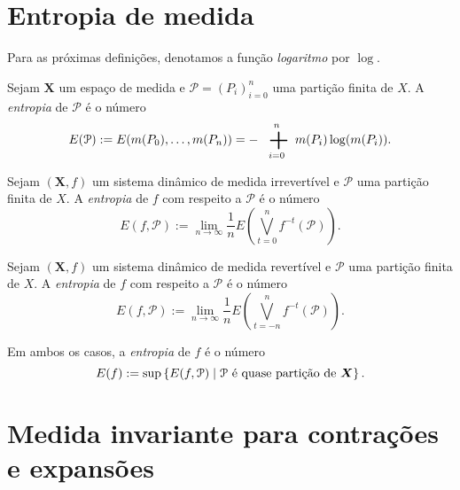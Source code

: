\section{Entropia de medida}

Para as próximas definições, denotamos a função \textit{logaritmo} por $\log$.

\begin{definition}
Sejam $\bm X$ um espaço de medida e $\mathcal P=(P_i)_{i=0}^n$ uma partição finita de $X$. A \emph{entropia} de $\mathcal P$ é o número
	\begin{equation*}
	E(\mathcal P) := E(\med(P_0),\ldots,\med(P_n)) = -\sum_{i=0}^n \med(P_i)\log(\med(P_i)).
	\end{equation*}
\end{definition}

\begin{definition}
Sejam $(\bm X,f)$ um sistema dinâmico de medida irrevertível e $\mathcal P$ uma partição finita de $X$. A \emph{entropia} de $f$ com respeito a $\mathcal P$ é o número
	\begin{equation*}
	E(f,\mathcal P) := \lim_{n \to \infty} \frac{1}{n} E\left(\bigvee_{t=0}^n f^{-t}(\mathcal P)\right).
	\end{equation*}

Sejam $(\bm X,f)$ um sistema dinâmico de medida revertível e $\mathcal P$ uma partição finita de $X$. A \emph{entropia} de $f$ com respeito a $\mathcal P$ é o número
	\begin{equation*}
	E(f,\mathcal P) := \lim_{n \to \infty} \frac{1}{n} E\left(\bigvee_{t=-n}^n f^{-t}(\mathcal P)\right).
	\end{equation*}

Em ambos os casos, a \emph{entropia} de $f$ é o número
	\begin{equation*}
	E(f) := \sup\left\{ E(f,\mathcal P) \;\middle\vert\; \mathcal P \text{ é quase partição de $\bm X$} \right\}.
	\end{equation*}
\end{definition}




\section{Medida invariante para contrações e expansões}

